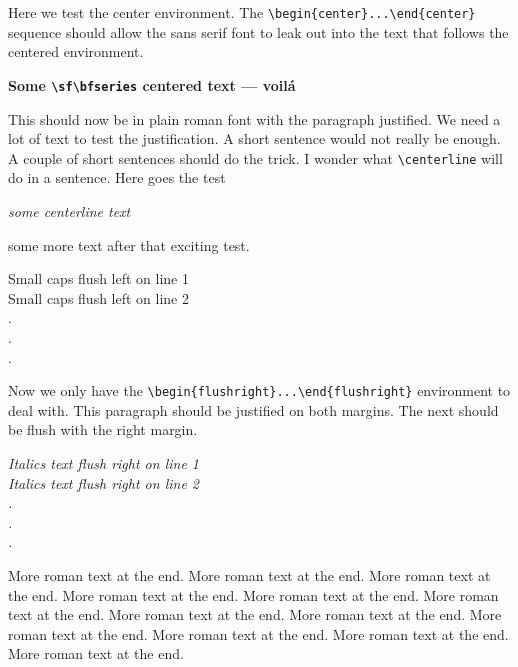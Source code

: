 \documentclass{article}
\begin{document}
Here we test the center environment.  The \verb#\begin{center}...\end{center}#
sequence should allow the sans serif font to leak out into the text that follows
the centered environment. 
\begin{center}
\sf\bfseries Some \verb#\sf\bfseries# centered text --- voil\'a
\end{center}
This should now be in plain roman font with the paragraph justified.
We need a lot of text to test the justification.  A short sentence would
not really be enough.  A couple of short sentences should do the trick.
I wonder what \verb#\centerline# will do in a sentence.  Here goes
the test \centerline{\it some centerline text} some more text after that
exciting test.
\begin{flushleft}
\sc Small caps flush left on line 1 \\
Small caps flush left on line 2 \\
.\\
.\\
.\\
\end{flushleft}
Now we only have the \verb#\begin{flushright}...\end{flushright}# environment
to deal with.  This paragraph should be justified on both margins. The next should
be flush with the right margin.

\begin{flushright}
\itshape 
Italics text flush right on line 1 \\
Italics text flush right on line 2 \\
.\\
.\\
.\\
\end{flushright}

More roman text at the end. More roman text at the end. More roman text at the end. 
More roman text at the end. More roman text at the end. More roman text at the end.
More roman text at the end. More roman text at the end. More roman text at the end.
More roman text at the end. More roman text at the end. More roman text at the end.
\end{document}
